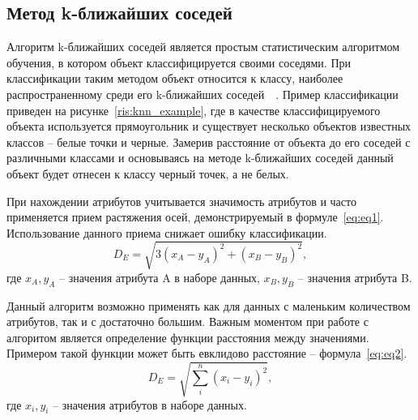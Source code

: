 \subsection{Метод k-ближайших соседей}
Алгоритм k-ближайших соседей является простым статистическим алгоритмом обучения, в котором объект классифицируется своими соседями. При классификации таким методом объект относится к классу, наиболее распространенному среди его k-ближайших соседей~\cite{potapov}~\cite{flah}. Пример классификации приведен на рисунке~\ref{ris:knn_example}, где в качестве классифицируемого объекта используется прямоугольник и существует несколько объектов известных классов -- белые точки и черные. Замерив расстояние от объекта до его соседей с различными классами и основываясь на методе k-ближайших соседей данный объект будет отнесен к классу черный точек, а не белых.
\\
\par
При нахождении атрибутов учитывается значимость атрибутов и часто применяется прием растяжения осей, демонстрируемый в формуле~\eqref{eq:eq1}. Использование данного приема снижает ошибку классификации.
\begin{equation}\label{eq:eq1}
D_{E} = \sqrt{3(x_{A} - y_{A})^{2} + (x_{B} - y_{B})^{2}},
\end{equation}
где $x_{A}, y_{A}$ -- значения атрибута A в наборе данных, $x_{B}, y_{B}$ -- значения атрибута B.
\par
Данный алгоритм возможно применять как для данных с маленьким количеством атрибутов, так и с достаточно большим. Важным моментом при работе с алгоритом является определение функции расстояния между значениями. Примером такой функции может быть евклидово расстояние -- формула~\eqref{eq:eq2}.
\begin{equation}\label{eq:eq2}
D_{E} = \sqrt{\sum_{i}^{n}(x_{i} - y_{i})^{2}},
\end{equation}
где $x_{i}, y_{i}$ -- значения атрибутов в наборе данных.
